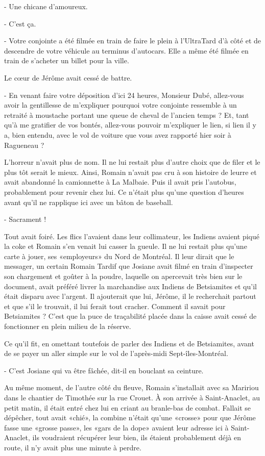 - Une chicane d’amoureux.

- C’est ça.

- Votre conjointe a été filmée en train de faire le plein à l’UltraTard d’à côté et de descendre de votre véhicule au terminus d’autocars. Elle a même été filmée en train de s’acheter un billet pour la ville.

Le cœur de Jérôme avait cessé de battre.

- En venant faire votre déposition d’ici 24 heures, Monsieur Dubé, allez-vous avoir la gentillesse de m’expliquer pourquoi votre conjointe ressemble à un retraité à moustache portant une queue de cheval de l’ancien temps ? Et, tant qu’à me gratifier de vos bontés, allez-vous pouvoir m’expliquer le lien, si lien il y a, bien entendu, avec le vol de voiture que vous avez rapporté hier soir à Ragueneau ?

L’horreur n’avait plus de nom. Il ne lui restait plus d’autre choix que de filer et le plus tôt serait le mieux. Ainsi, Romain n’avait pas cru à son histoire de leurre et avait abandonné la camionnette à La Malbaie. Puis il avait pris l’autobus, probablement pour revenir chez lui. Ce n’était plus qu’une question d’heures avant qu’il ne rapplique ici avec un bâton de baseball.

- Sacrament !

Tout avait foiré. Les flics l’avaient dans leur collimateur, les Indiens avaient piqué la coke et Romain s’en venait lui casser la gueule. Il ne lui restait plus qu’une carte à jouer, ses «employeurs» du Nord de Montréal. Il leur dirait que le messager, un certain Romain Tardif que Josiane avait filmé en train d’inspecter son chargement et goûter à la poudre, laquelle on apercevait très bien sur le document, avait préféré livrer la marchandise aux Indiens de Betsiamites et qu’il était disparu avec l’argent. Il ajouterait que lui, Jérôme, il le recherchait partout et que s’il le trouvait, il lui ferait tout cracher. Comment il savait pour Betsiamites ? C’est que la puce de traçabilité placée dans la caisse avait cessé de fonctionner en plein milieu de la réserve.

Ce qu’il fit, en omettant toutefois de parler des Indiens et de Betsiamites, avant de se payer un aller simple sur le vol de l’après-midi Sept-îles-Montréal.

- C’est Josiane qui va être fâchée, dit-il en bouclant sa ceinture.

Au même moment, de l’autre côté du fleuve, Romain s’installait avec sa Maririou dans le chantier de Timothée sur la rue Crouet. À son arrivée à Saint-Anaclet, au petit matin, il était entré chez lui en criant au branle-bas de combat. Fallait se dépêcher, tout avait «chié», la combine n’était qu’une «crosse» pour que Jérôme fasse une «grosse passe», les «gars de la dope» avaient leur adresse ici à Saint-Anaclet, ils voudraient récupérer leur bien, ils étaient probablement déjà en route, il n’y avait plus une minute à perdre.

